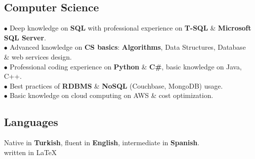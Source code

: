\documentclass[11pt,twoside,a4paper]{article}
\begin{document}
    \subsection{Computer Science}
      $\bullet$ Deep knowledge on \textbf{SQL} with professional experience on \textbf{T-SQL} \& \textbf{Microsoft SQL Server}.\\
      $\bullet$ Advanced knowledge on \textbf{CS basics}: \textbf{Algorithms}, Data Structures, Database \& web services design.\\
      $\bullet$ Professional coding experience on \textbf{Python} \& \textbf{C\#}, basic knowledge on Java, C++.\\
      $\bullet$ Best practices of \textbf{RDBMS} \& \textbf{NoSQL} (Couchbase, MongoDB) usage.\\
      $\bullet$ Basic knowledge on cloud computing on AWS \& cost optimization.
    \subsection{Languages}
      Native in \textbf{Turkish}, fluent in \textbf{English}, intermediate in \textbf{Spanish}.\\

    \hfill written in \LaTeX
\end{document}
